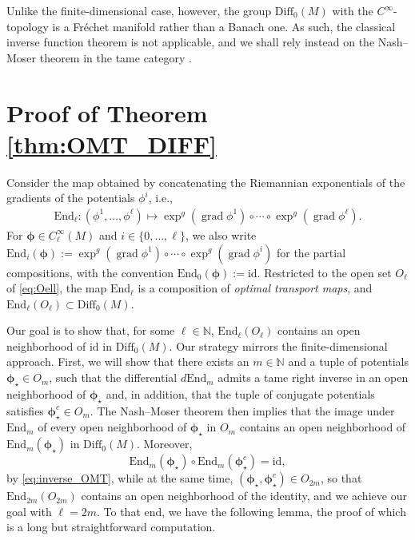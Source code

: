 \documentclass{article}
\theoremstyle{remark}
\newcommand{\M}{M}
\newcommand{\CinfV}[1]{C_{#1}^{\infty}(\M)}
\newcommand{\Diff}{\mathrm{Diff}_0(\M)}
\DeclareMathOperator{\grad}{\mathrm{grad}}
\begin{document}
Unlike the finite-dimensional case, however, the group $\Diff$ with the $C^\infty$-topology is a Fr\'echet manifold rather than a Banach one. As such, the classical inverse function theorem is not applicable, and we shall rely instead on the Nash--Moser theorem in the tame category \cite{Hamilton1982}.
%
\section{Proof of Theorem \ref{thm:OMT_DIFF}}\label{sec:technical}
%
Consider the map obtained by concatenating the Riemannian exponentials of the gradients of the potentials $\phi^i$, i.e., 
%
\begin{align*}
    \mathrm{End}_{\ell}:(\phi^1,\dots,\phi^\ell)\mapsto \exp^g(\grad\phi^1)\circ\cdots \circ\exp^g(\grad\phi^\ell).
\end{align*}
%
For $\bm{\phi}\in\CinfV{\ell}$ and $i\in\{0,\dots,\ell\}$, we also write $\mathrm{End}_{i}(\bm{\phi}):=\exp^g(\grad\phi^1)\circ\cdots\circ\exp^g(\grad\phi^i)$ for the partial compositions, with the convention $\mathrm{End}_{0}(\bm{\phi}):=\mathrm{id}$. Restricted to the open set $O_\ell$ of \eqref{eq:Oell}, the map $\mathrm{End}_{\ell}$ is a composition of {\em optimal transport maps}, and $\mathrm{End}_{\ell}(O_\ell)\subset\Diff$.
%

%
Our goal is to show that, for some $\ell\in\mathbb{N}$, $\mathrm{End}_{\ell}(O_\ell)$ contains an open neighborhood of $\mathrm{id}$ in $\Diff$. 
%
Our strategy mirrors the finite-dimensional approach. First, we will show that there exists an $m\in\mathbb{N}$ and a tuple of potentials $\bm{\phi}_{\star}\in O_m$, such that the differential $d\mathrm{End}_{m}$ admits a tame right inverse in an open neighborhood of $\bm{\phi}_{\star}$ and, in addition, that the tuple of conjugate potentials satisfies $\bm{\phi}_{\star}^c\in O_m$.
%
The Nash--Moser theorem then implies that the image under $\mathrm{End}_{m}$ of every open neighborhood of $\bm{\phi}_{\star}$ in $O_m$ contains an open neighborhood of $\mathrm{End}_{m}(\bm{\phi}_{\star})$ in $\Diff$. 
%
Moreover,
%
\[
\mathrm{End}_{m}(\bm{\phi}_\star)\circ\mathrm{End}_{m}(\bm{\phi}_\star^c)=\mathrm{id},
\]
by \eqref{eq:inverse_OMT}, while at the same time, $(\bm{\phi}_\star,\bm{\phi}_\star^c)\in O_{2m}$, so that $\mathrm{End}_{2m}(O_{2m})$ contains an open neighborhood of the identity, and we achieve our goal with $\ell = 2m$. 
%
To that end, we have the following lemma, the proof of which is a long but straightforward computation. 
\end{document}
